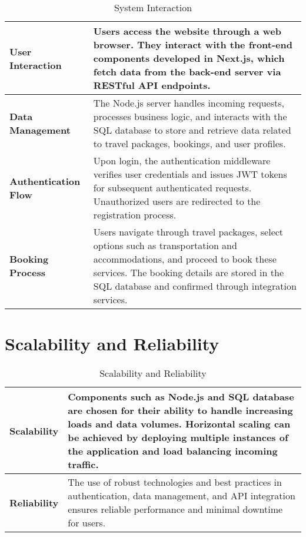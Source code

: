 \documentclass{scrreprt}
\begin{document}
    \begin{table}[ht]
    \centering
    \caption{System Interaction}
    \begin{tabular}{|p{4cm}|p{10cm}|}
    \hline
    \textbf{User Interaction} & Users access the website through a web browser. They interact with the front-end components developed in Next.js, which fetch data from the back-end server via RESTful API endpoints. \\
    \hline
    \textbf{Data Management} & The Node.js server handles incoming requests, processes business logic, and interacts with the SQL database to store and retrieve data related to travel packages, bookings, and user profiles. \\
    \hline
    \textbf{Authentication Flow} & Upon login, the authentication middleware verifies user credentials and issues JWT tokens for subsequent authenticated requests. Unauthorized users are redirected to the registration process. \\
    \hline
    \textbf{Booking Process} & Users navigate through travel packages, select options such as transportation and accommodations, and proceed to book these services. The booking details are stored in the SQL database and confirmed through integration services. \\
    \hline
    \end{tabular}
    \end{table}
    
    \vspace{0.5cm}
    
    
    \begin{table}[ht]
    \section{Scalability and Reliability}
    \centering
    \caption{Scalability and Reliability}
    \begin{tabular}{|p{4cm}|p{10cm}|}
    \hline
    \textbf{Scalability} & Components such as Node.js and SQL database are chosen for their ability to handle increasing loads and data volumes. Horizontal scaling can be achieved by deploying multiple instances of the application and load balancing incoming traffic. \\
    \hline
    \textbf{Reliability} & The use of robust technologies and best practices in authentication, data management, and API integration ensures reliable performance and minimal downtime for users. \\
    \hline
    \end{tabular}
    \end{table}
\end{document}
